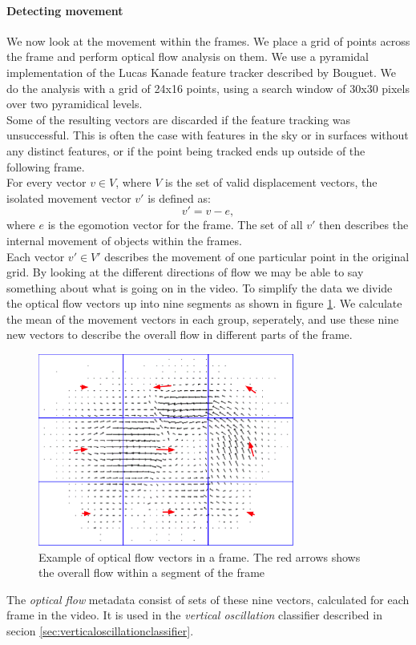 \paragraph{Detecting movement}
%
We now look at the movement within the frames. We place a grid of points across the frame and perform optical flow analysis on them. We use a pyramidal implementation of the Lucas Kanade feature tracker described by Bouguet\cite{Bouguet2000}. We do the analysis with a grid of 24x16 points, using a search window of 30x30 pixels over two pyramidical levels.\\
Some of the resulting vectors are discarded if the feature tracking was unsuccessful. This is often the case with features in the sky or in surfaces without any distinct features, or if the point being tracked ends up outside of the following frame.\\
For every vector $v \in V$, where $V$ is the set of valid displacement vectors, the isolated movement vector $v'$ is defined as:
\begin{equation}
v' = v - e,
\end{equation}
where $e$ is the egomotion vector for the frame. The set of all $v'$ then describes the internal movement of objects within the frames.\\
Each vector $v' \in V'$ describes the movement of one particular point in the original grid. By looking at the different directions of flow we may be able to say something about what is going on in the video. To simplify the data we divide the optical flow vectors up into nine segments as shown in figure \ref{fig:opticalflow}. We calculate the mean of the movement vectors in each group, seperately, and use these nine new vectors to describe the overall flow in different parts of the frame.
%
%
\begin{figure}
     \centering
     \includegraphics[width=0.75\textwidth]{img/optical_flow.png}
     \caption{Example of optical flow vectors in a frame. The red arrows shows the overall flow within a segment of the frame}\label{fig:opticalflow}
\end{figure}
%
The \textit{optical flow} metadata consist of sets of these nine vectors, calculated for each frame in the video. It is used in the \textit{vertical oscillation} classifier described in secion \ref{sec:verticaloscillationclassifier}.
%
